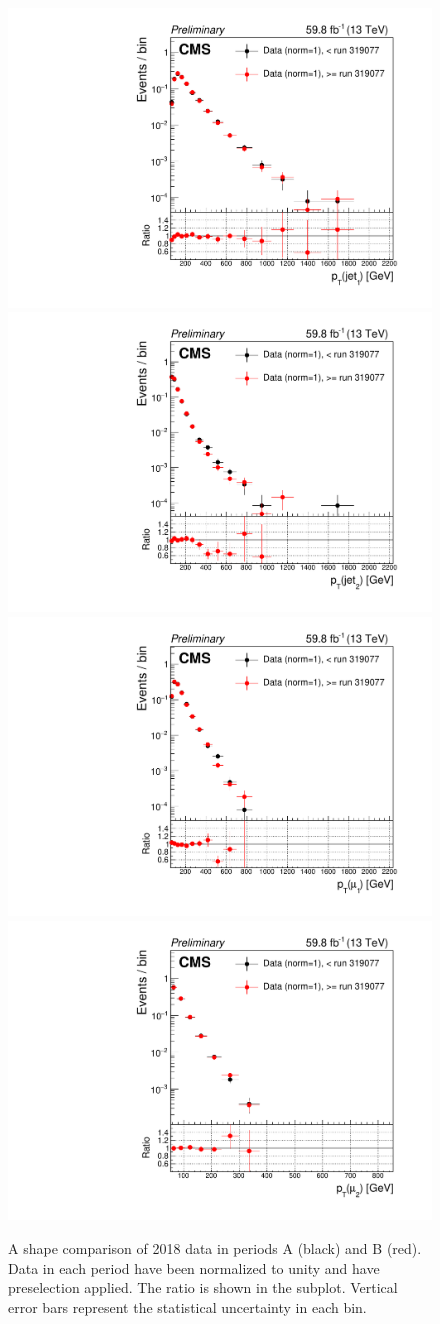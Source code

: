\begin{figure}[H]
    \centering
    {\includegraphics[width=.49\textwidth]{Images/Analysis/Results_HEMFailureStudyPlots_Data_BeforeAfterRun319077/BasicLQ_uujj_Pt_jet1_standard.pdf}}
    {\includegraphics[width=.49\textwidth]{Images/Analysis/Results_HEMFailureStudyPlots_Data_BeforeAfterRun319077/BasicLQ_uujj_Pt_jet2_standard.pdf}}
    {\includegraphics[width=.49\textwidth]{Images/Analysis/Results_HEMFailureStudyPlots_Data_BeforeAfterRun319077/BasicLQ_uujj_Pt_muon1_standard.pdf}}
    {\includegraphics[width=.49\textwidth]{Images/Analysis/Results_HEMFailureStudyPlots_Data_BeforeAfterRun319077/BasicLQ_uujj_Pt_muon2_standard.pdf}}
    \caption{A shape comparison of 2018 data in periods A (black) and B (red). Data in each period have been normalized to unity and have preselection applied. The ratio \RatioDataAB is shown in the subplot. Vertical error bars represent the statistical uncertainty in each bin.}
    \label{figapp:hemjetmuonpt}
\end{figure}

